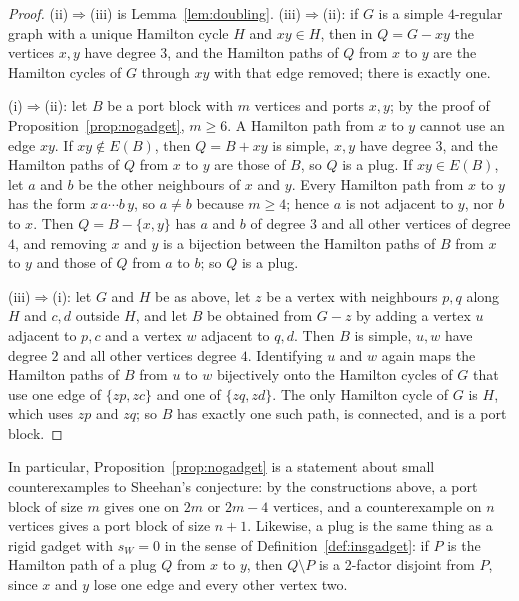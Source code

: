 \documentclass[11pt,a4paper]{article}
\theoremstyle{definition}
\theoremstyle{remark}
\begin{document}
\begin{proof}
(ii)$\Rightarrow$(iii) is Lemma~\ref{lem:doubling}. (iii)$\Rightarrow$(ii): if $G$ is a simple $4$-regular graph with a unique Hamilton cycle $H$ and $xy\in H$, then in $Q=G-xy$ the vertices $x,y$ have degree $3$, and the Hamilton paths of $Q$ from $x$ to $y$ are the Hamilton cycles of $G$ through $xy$ with that edge removed; there is exactly one.

(i)$\Rightarrow$(ii): let $B$ be a port block with $m$ vertices and ports $x,y$; by the proof of Proposition~\ref{prop:nogadget}, $m\ge6$. A Hamilton path from $x$ to $y$ cannot use an edge $xy$. If $xy\notin E(B)$, then $Q=B+xy$ is simple, $x,y$ have degree $3$, and the Hamilton paths of $Q$ from $x$ to $y$ are those of $B$, so $Q$ is a plug. If $xy\in E(B)$, let $a$ and $b$ be the other neighbours of $x$ and $y$. Every Hamilton path from $x$ to $y$ has the form $x\,a\cdots b\,y$, so $a\ne b$ because $m\ge4$; hence $a$ is not adjacent to $y$, nor $b$ to $x$. Then $Q=B-\{x,y\}$ has $a$ and $b$ of degree $3$ and all other vertices of degree $4$, and removing $x$ and $y$ is a bijection between the Hamilton paths of $B$ from $x$ to $y$ and those of $Q$ from $a$ to $b$; so $Q$ is a plug.

(iii)$\Rightarrow$(i): let $G$ and $H$ be as above, let $z$ be a vertex with neighbours $p,q$ along $H$ and $c,d$ outside $H$, and let $B$ be obtained from $G-z$ by adding a vertex $u$ adjacent to $p,c$ and a vertex $w$ adjacent to $q,d$. Then $B$ is simple, $u,w$ have degree $2$ and all other vertices degree $4$. Identifying $u$ and $w$ again maps the Hamilton paths of $B$ from $u$ to $w$ bijectively onto the Hamilton cycles of $G$ that use one edge of $\{zp,zc\}$ and one of $\{zq,zd\}$. The only Hamilton cycle of $G$ is $H$, which uses $zp$ and $zq$; so $B$ has exactly one such path, is connected, and is a port block.
\end{proof}

In particular, Proposition~\ref{prop:nogadget} is a statement about small counterexamples to Sheehan's conjecture: by the constructions above, a port block of size $m$ gives one on $2m$ or $2m-4$ vertices, and a counterexample on $n$ vertices gives a port block of size $n+1$. Likewise, a plug is the same thing as a rigid gadget with $s_W=0$ in the sense of Definition~\ref{def:insgadget}: if $P$ is the Hamilton path of a plug $Q$ from $x$ to $y$, then $Q\setminus P$ is a 2-factor disjoint from $P$, since $x$ and $y$ lose one edge and every other vertex two.
\end{document}
